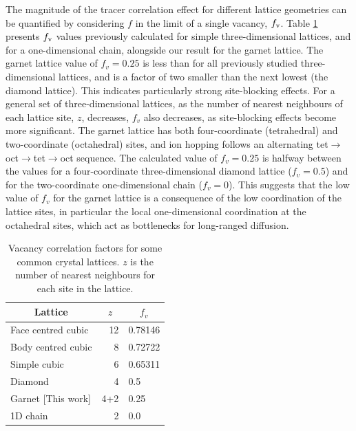 \documentclass[aps,prb,twocolumn,superscriptaddress,reprint]{revtex4-1}
\begin{document}
The magnitude of the tracer correlation effect for different lattice geometries can be quantified by considering $f$ in the limit of a single vacancy, $f_{\mathrm{v}}$. 
Table \ref{tab:vacancy_correlation_factors} presents $f_{\mathrm{v}}$ values previously calculated for simple three-dimensional lattices,\cite{CompaanAndHaven_TransFaradaySoc1956} and for a one-dimensional chain,\cite{Mehrer_DiffusionBook} alongside our result for the garnet lattice. 
The garnet lattice value of $f_v=0.25$ is less than for all previously studied three-dimensional lattices, and is a factor of two smaller than the next lowest (the diamond lattice). This indicates particularly strong site-blocking effects.  
For a general set of three-dimensional lattices, as the number of nearest neighbours of each lattice site, $z$, decreases, $f_v$ also decreases, as site-blocking effects become more significant.\cite{Friauf_JApplPhys1962}
The garnet lattice has both four-coordinate (tetrahedral) and two-coordinate (octahedral) sites, and ion hopping follows an alternating tet$\to$oct$\to$tet$\to$oct sequence. 
The calculated value of $f_v=0.25$ is halfway between the values for a four-coordinate three-dimensional diamond lattice ($f_v=0.5$) and for the two-coordinate one-dimensional chain ($f_v=0$).\cite{Mehrer_DiffusionBook} 
This suggests that the low value of $f_v$ for the garnet lattice is a consequence of the low coordination of the lattice sites, in particular the local one-dimensional coordination at the octahedral sites, which act as bottlenecks for long-ranged diffusion. 

\begin{table}[htb]
   \begin{center}
     \begin{tabular}{lrl} \hline
        \multicolumn{1}{c}{Lattice} & \multicolumn{1}{c}{$z$} & \multicolumn{1}{c}{$f_v$} \\ \hline
        Face centred cubic\cite{CompaanAndHaven_TransFaradaySoc1956} & 12 & 0.78146 \\
        Body centred cubic\cite{CompaanAndHaven_TransFaradaySoc1956} & 8 & 0.72722 \\
        Simple cubic\cite{CompaanAndHaven_TransFaradaySoc1956} & 6 & 0.65311 \\
        Diamond\cite{CompaanAndHaven_TransFaradaySoc1956} & 4 & 0.5 \\
        Garnet [This work] & 4+2 & 0.25 \\ 
        1D chain\cite{Mehrer_DiffusionBook} & 2 & 0.0 \\ \hline
     \end{tabular}
   \caption{\label{tab:vacancy_correlation_factors}Vacancy correlation factors for some common crystal lattices. $z$ is the number of nearest neighbours for each site in the lattice.}
   \end{center}
 \end{table}
\end{document}
